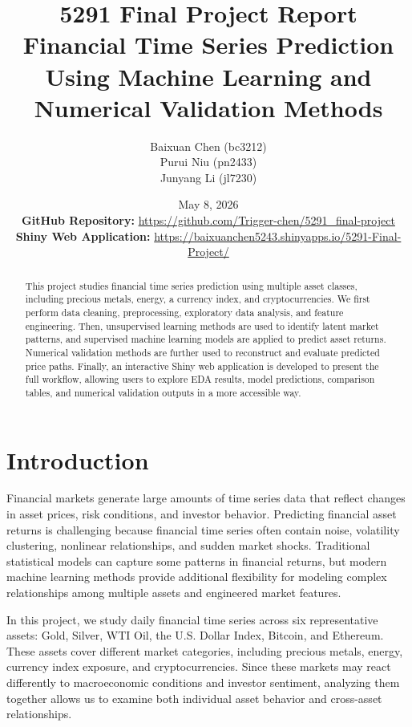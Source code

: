 \documentclass[12pt]{article}
\title{
    \textbf{5291 Final Project Report} \\
    \large Financial Time Series Prediction Using Machine Learning and Numerical Validation Methods
}
\author{
    Baixuan Chen \quad (bc3212) \\
    Purui Niu \quad (pn2433) \\
    Junyang Li \quad (jl7230)
}
\date{
    May 8, 2026 \\[0.5cm]
    \textbf{GitHub Repository:} 
    \href{https://github.com/Trigger-chen/5291_final-project}
    {https://github.com/Trigger-chen/5291\_final-project}
    \\[0.25cm]
    \textbf{Shiny Web Application:} 
    \href{https://baixuanchen5243.shinyapps.io/5291-Final-Project/}
    {https://baixuanchen5243.shinyapps.io/5291-Final-Project/}
}
\begin{document}
\maketitle

\begin{abstract}
This project studies financial time series prediction using multiple asset classes, including precious metals, energy, a currency index, and cryptocurrencies. We first perform data cleaning, preprocessing, exploratory data analysis, and feature engineering. Then, unsupervised learning methods are used to identify latent market patterns, and supervised machine learning models are applied to predict asset returns. Numerical validation methods are further used to reconstruct and evaluate predicted price paths. Finally, an interactive Shiny web application is developed to present the full workflow, allowing users to explore EDA results, model predictions, comparison tables, and numerical validation outputs in a more accessible way.
\end{abstract}

\newpage

\tableofcontents

\newpage


\section{Introduction}

Financial markets generate large amounts of time series data that reflect changes in asset prices, risk conditions, and investor behavior. Predicting financial asset returns is challenging because financial time series often contain noise, volatility clustering, nonlinear relationships, and sudden market shocks. Traditional statistical models can capture some patterns in financial returns, but modern machine learning methods provide additional flexibility for modeling complex relationships among multiple assets and engineered market features.

In this project, we study daily financial time series across six representative assets: Gold, Silver, WTI Oil, the U.S. Dollar Index, Bitcoin, and Ethereum. These assets cover different market categories, including precious metals, energy, currency index exposure, and cryptocurrencies. Since these markets may react differently to macroeconomic conditions and investor sentiment, analyzing them together allows us to examine both individual asset behavior and cross-asset relationships.
\end{document}
